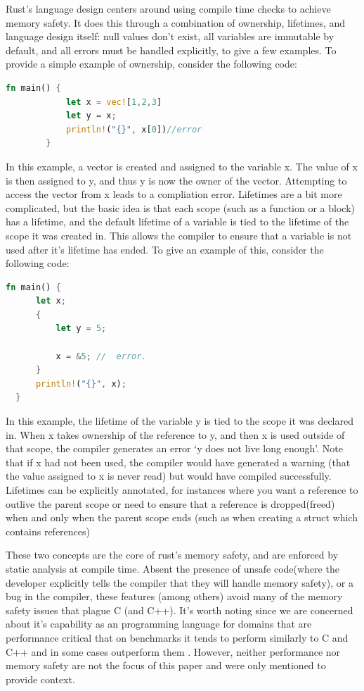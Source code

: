 \documentclass[conference]{IEEEtran}
\begin{document}
 {
  Rust's language design centers around using compile time checks to achieve memory safety. It does this through a combination of ownership, lifetimes, and language design itself:
  null values don't exist, all variables are immutable by default, and all errors must be handled explicitly, to give a few examples. To provide a simple example of ownership, consider the following code:
  \begin{lstlisting}[language=Rust]
    fn main() {
            let x = vec![1,2,3]
            let y = x;
            println!("{}", x[0])//error 
        }
    \end{lstlisting}
  In this example, a vector is created and assigned to the variable x. The value of x is then assigned to y, and thus y is now the owner of the vector. Attempting to access the vector from x leads to a compliation error.
  Lifetimes are a bit more complicated, but the basic idea is that each scope (such as a function or a block) has a lifetime, and the default lifetime of a variable is tied to the lifetime of the scope it was created in. This allows the compiler to
  ensure that a variable is not used after it's lifetime has ended. To give an example of this, consider the following code:
  \begin{lstlisting}[language=Rust]
  fn main() {
      let x;                                       
      {                         
          let y = 5;           

          x = &5; //  error.
      }                    
      println!("{}", x);       
  }                             
      \end{lstlisting}
 }{

  In this example, the lifetime of the variable y is tied to the scope it was declared in. When x takes ownership of the reference to y, and then x is used outside of that scope, the compiler generates an error `y does not live long enough'. Note that
  if x had not been used, the compiler would have generated a warning (that the value assigned to x is never read) but would have compiled successfully. Lifetimes can be explicitly annotated, for instances where you want a reference to outlive the parent
  scope or need to ensure that a reference is dropped(freed) when and only when the parent scope ends (such as when creating a struct which contains references)
 }

 {
  These two concepts are the core of rust's memory safety, and are enforced by static analysis at compile time. Absent the presence of unsafe code(where the developer explicitly tells the compiler that they will handle memory safety), or a bug in the compiler, these features (among others) avoid many of the memory safety issues that plague C (and C++).
  It's worth noting since we are concerned about it's capability as an programming language for domains that are performance critical that on benchmarks it tends to perform similarly to C and C++\cite{costanzoPerformanceVsProgramming2021} and in some cases outperform them \cite{rooneyEvaluatingFFTPerformance2023}. However, neither performance nor memory safety are not the focus of this paper and were only mentioned to provide context.
 }
\end{document}
